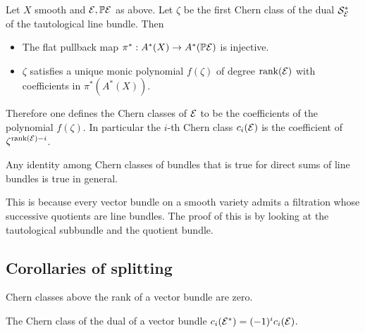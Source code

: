 \documentclass[12pt]{article}
\begin{document}
\begin{theorem}
    Let $X$ smooth and ${\mathcal{E}}, \mathbb{P}{\mathcal{E}}$ as above. Let $\zeta$ be the first Chern class of the dual ${\mathcal{S}}_{\mathcal{E}}^*$
    of the tautological line bundle. Then \begin{itemize}
        \item The flat pullback map $\pi^*:A^*(X) \to A^*(\mathbb{P}{\mathcal{E}})$ is injective.
        \item $\zeta$ satisfies a unique monic polynomial 
        $f(\zeta)$ of degree $\operatorname{rank}({\mathcal{E}})$ with coefficients in $\pi^*(A^*(X))$.
    \end{itemize}
\end{theorem}
Therefore one defines the Chern classes of ${\mathcal{E}}$ to be the coefficients of the polynomial $f(\zeta)$. 
In particular the $i$-th Chern class $c_i({\mathcal{E}})$ is the coefficient of $\zeta^{\operatorname{rank}({\mathcal{E}})-i}$. 

\begin{theorem}
     Any identity among Chern classes of bundles that is 
    true for direct sums of line bundles is true in general.
\end{theorem}

This is because every vector bundle on a smooth variety admits a filtration whose successive quotients are line bundles.
The proof of this is by looking at the tautological subbundle and the quotient bundle.

\subsection{Corollaries of splitting}
\begin{corollary}
    Chern classes above the rank of a vector bundle are zero.
\end{corollary}
\begin{corollary}
    The Chern class of the dual of a vector bundle $c_i({\mathcal{E}}^*) = (-1)^i c_i({\mathcal{E}})$.
\end{corollary}
\end{document}
